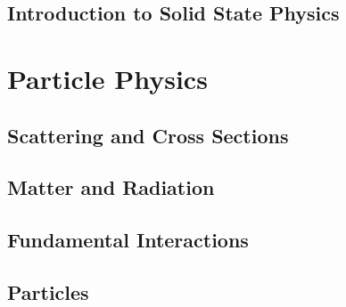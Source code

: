 \documentclass[a4paper, 11pt]{book}
\newcommand{\1}{\opr{\mathds{1}}}
\theoremstyle{definition}
\theoremstyle{remark}
\begin{document}
	\chapter{Introduction to Solid State Physics}
		
%		
%		
%		
%		
%		
\part{Particle Physics}
	\chapter{Scattering and Cross Sections}
	
	\chapter{Matter and Radiation}
	
	\chapter{Fundamental Interactions}
	
	\chapter{Particles}
	
\end{document}
